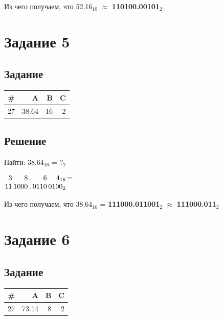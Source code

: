 \documentclass[11pt]{article}
\begin{document}
Из чего получаем, что 52.16\(_{\text{10}}\) \(\approx\) \textbf{110100.00101\(_{\text{2}}\)}

\section{Задание 5}
\label{sec:org400f801}
\subsection{Задание}
\label{sec:orgf58f675}
\begin{center}
\begin{tabular}{|r|rrr|}
\hline
\# & A & B & C\\
\hline
27 & 38.64 & 16 & 2\\
\hline
\end{tabular}
\end{center}

\subsection{Решение}
\label{sec:org55b9f0c}
Найти: 38.64\(_{\text{16}}\) = ?\(_{\text{2}}\)
\begin{center}
\(\arraycolsep=0.05em
\begin{array}{rrrrcrrrrrr}
3  &&    8 && . &&    6 &&    4_{16} && = \\
11 && 1000 && . && 0110 && 0100_2 \\
\end{array}\)
\end{center}

Из чего получаем, что 38.64\(_{\text{16}}\) = \textbf{111000.011001\(_{\text{2}}\)} \(\approx\) \textbf{111000.011\(_{\text{2}}\)}

\section{Задание 6}
\label{sec:orge0b9e4b}
\subsection{Задание}
\label{sec:orgedbdf44}
\begin{center}
\begin{tabular}{|r|rrr|}
\hline
\# & A & B & C\\
\hline
27 & 73.14 & 8 & 2\\
\hline
\end{tabular}
\end{center}
\end{document}
